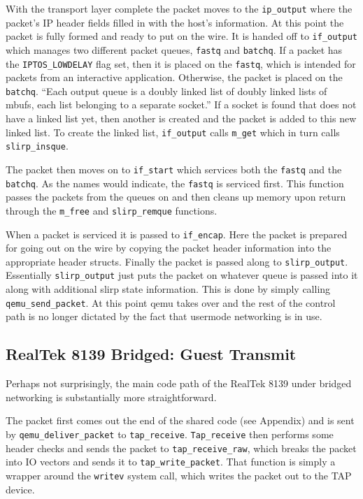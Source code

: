 With the transport layer complete the packet moves to the \texttt{ip\_output} where the packet's IP header fields filled in with the host's information.
At this point the packet is fully formed and ready to put on the wire.
It is handed off to \texttt{if\_output} which manages two different packet queues, \texttt{fastq} and \texttt{batchq}.
If a packet has the \texttt{IPTOS\_LOWDELAY} flag set, then it is placed on the \texttt{fastq}, which is intended for packets from an interactive application.
Otherwise, the packet is placed on the \texttt{batchq}.
``Each output queue is a doubly linked list of doubly linked lists of mbufs, each list belonging to a separate socket.''
If a socket is found that does not have a linked list yet, then another is created and the packet is added to this new linked list.
To create the linked list, \texttt{if\_output} calls \texttt{m\_get} which in turn calls \texttt{slirp\_insque}.

The packet then moves on to \texttt{if\_start} which services both the \texttt{fastq} and the \texttt{batchq}.
As the names would indicate, the \texttt{fastq} is serviced first.
This function passes the packets from the queues on and then cleans up memory upon return through the \texttt{m\_free} and \texttt{slirp\_remque} functions.

When a packet is serviced it is passed to \texttt{if\_encap}.
Here the packet is prepared for going out on the wire by copying the packet header information into the appropriate header structs.
Finally the packet is passed along to \texttt{slirp\_output}. 
Essentially \texttt{slirp\_output} just puts the packet on whatever queue is passed into it along with additional slirp state information.
This is done by simply calling \texttt{qemu\_send\_packet}.
At this point qemu takes over and the rest of the control path is no longer dictated by the fact that usermode networking is in use.

\subsection{RealTek 8139 Bridged: Guest Transmit}
Perhaps not surprisingly, the main code path of the RealTek 8139 under bridged networking is substantially more straightforward.  

The packet first comes out the end of the shared code (see Appendix) and is sent by \texttt{qemu\_deliver\_packet} to \texttt{tap\_receive}. \texttt{Tap\_receive} then performs some header checks and sends the packet to \texttt{tap\_receive\_raw}, which breaks the packet into IO vectors and sends it to \texttt{tap\_write\_packet}. That function is simply a wrapper around the \texttt{writev} system call, which writes the packet out to the TAP device. 

